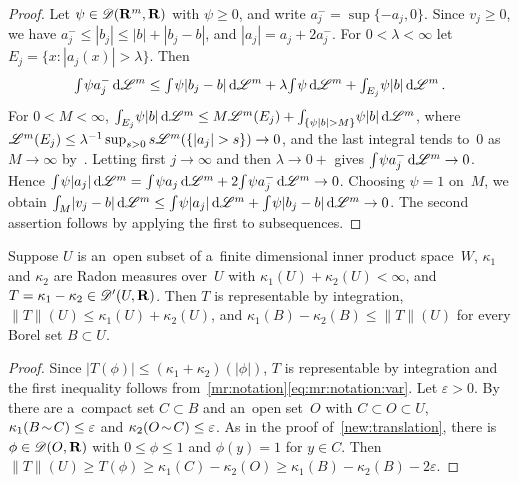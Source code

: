\documentclass[a4paper,twoside,leqno]{article}
\begin{document}
\begin{proof}
    Let $\psi \in \mathscr{D}(\mathbf{R}^m,\mathbf{R})$ with $\psi \ge 0$, and write $a_j^- = \sup \{ -a_j, 0 \}$.
    Since $v_j \ge 0$, we have $a_j^- \le |b_j| \le |b| + |b_j - b|$, and $|a_j| = a_j + 2
    a_j^-$. For $0 < \lambda < \infty$ let $E_j = \{ x : |a_j(x)| > \lambda \}$. Then
    \begin{displaymath}
        {\textstyle\int_{}^{}} \psi a_j^- \,\mathrm{d} \mathscr{L}^m \le {\textstyle\int_{}^{}} \psi |b_j - b| \,\mathrm{d} \mathscr{L}^m + \lambda
        {\textstyle\int_{}^{}} \psi \,\mathrm{d} \mathscr{L}^m + {\textstyle\int_{E_j}^{}} \psi |b| \,\mathrm{d} \mathscr{L}^m \,.
    \end{displaymath}
    For $0 < M < \infty$, ${\textstyle\int_{E_j}^{}} \psi |b| \,\mathrm{d} \mathscr{L}^m \le M \mathscr{L}^m(E_j) + {\textstyle\int_{\{ \psi |b|
    > M \}}^{}} \psi |b| \,\mathrm{d} \mathscr{L}^m$, where $\mathscr{L}^m(E_j) \le \lambda^{-1} \sup_{s > 0} s \mathscr{L}^m(\{ |a_j|
    > s \}) \to 0$, and the last integral tends to~$0$ as $M \to \infty$
    by~\cite[2.4.9]{Federer1969}. Letting first $j \to \infty$ and then $\lambda \to 0+$ gives ${\textstyle\int_{}^{}} \psi a_j^- \,\mathrm{d} \mathscr{L}^m \to 0$. Hence ${\textstyle\int_{}^{}} \psi
    |a_j| \,\mathrm{d} \mathscr{L}^m = {\textstyle\int_{}^{}} \psi a_j \,\mathrm{d} \mathscr{L}^m + 2 {\textstyle\int_{}^{}} \psi a_j^- \,\mathrm{d} \mathscr{L}^m \to 0$.
    Choosing $\psi = 1$ on~$M$, we obtain ${\textstyle\int_{M}^{}} |v_j - b| \,\mathrm{d} \mathscr{L}^m \le {\textstyle\int_{}^{}}
    \psi |a_j| \,\mathrm{d} \mathscr{L}^m + {\textstyle\int_{}^{}} \psi |b_j - b| \,\mathrm{d} \mathscr{L}^m \to 0$. The second assertion
    follows by applying the first to subsequences.
\end{proof}

\begin{lemma}[new]
    \label{new:variation}
    Suppose $U$ is an~open subset of a~finite dimensional inner product space~$W$, $\kappa_1$ and
    $\kappa_2$ are Radon measures over~$U$ with $\kappa_1(U) + \kappa_2(U) < \infty$, and $T =
    \kappa_1 - \kappa_2 \in \mathscr{D}'(U,\mathbf{R})$. Then $T$ is representable by integration, $\|T\|(U) \le
    \kappa_1(U) + \kappa_2(U)$, and $\kappa_1(B) - \kappa_2(B) \le \|T\|(U)$ for every Borel set $B
    \subset U$.
\end{lemma}

\begin{proof}
    Since $|T(\phi)| \le (\kappa_1 + \kappa_2)(|\phi|)$, $T$ is representable by integration and
    the first inequality follows from~\ref{mr:notation}\eqref{eq:mr:notation:var}. Let $\varepsilon >
    0$. By~\cite[2.2.5]{Federer1969} there are a~compact set $C \subset B$ and an~open set~$O$
    with $C \subset O \subset U$, $\kappa_1(B \!\sim\! C) \le \varepsilon$ and $\kappa_2(O
    \!\sim\! C) \le \varepsilon$. As in the proof of~\ref{new:translation}, there is $\phi \in
    \mathscr{D}(O,\mathbf{R})$ with $0 \le \phi \le 1$ and $\phi(y) = 1$ for $y \in C$. Then $\|T\|(U) \ge
    T(\phi) \ge \kappa_1(C) - \kappa_2(O) \ge \kappa_1(B) - \kappa_2(B) - 2 \varepsilon$.
\end{proof}
\end{document}
